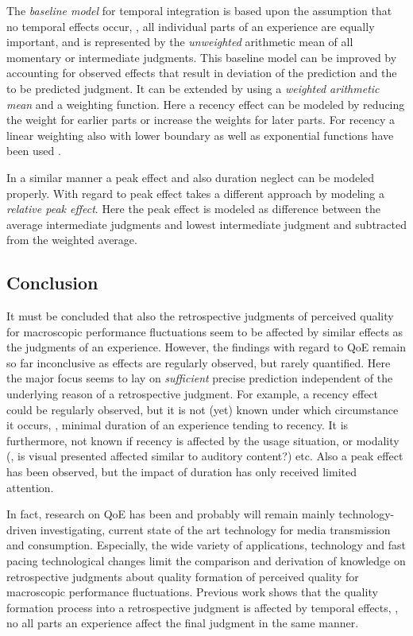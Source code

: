 The \emph{baseline model} for temporal integration is based upon the assumption that no temporal effects occur, \ie, all individual parts of an experience are equally important, and is represented by the \emph{unweighted} arithmetic mean of all momentary or intermediate judgments.
This baseline model can be improved by accounting for observed effects that result in deviation of the prediction and the to be predicted judgment.
It can be extended by using a \emph{weighted arithmetic mean} and a weighting function.
Here a recency effect can be modeled by reducing the weight for earlier parts \citep[\cf,][]{rosenbluth_testing_1998, weiss_modeling_2009, hamberg_time-varying_1999} or increase the weights for later parts.
For recency a linear weighting also with lower boundary \citep[\eg,][]{weiss_modeling_2009} as well as exponential functions have been used \cite[\eg,][]{hamberg_time-varying_1999}.

In a similar manner a peak effect and also duration neglect can be modeled properly.
With regard to 	peak effect \citet{weiss_modeling_2009} takes a different approach by modeling a \emph{relative peak effect}.
Here the peak effect is modeled as difference between the average intermediate judgments and lowest intermediate judgment and subtracted from the weighted average.


\subsection{Conclusion}
It must be concluded that also the retrospective judgments of perceived quality for macroscopic performance fluctuations seem to be affected by similar effects as the judgments of an experience.
However, the findings with regard to \ac{QoE} remain so far inconclusive as effects are regularly observed, but rarely quantified.
Here the major focus seems to lay on \emph{sufficient} precise prediction independent of the underlying reason of a retrospective judgment.
For example, a recency effect could be regularly observed, but it is not (yet) known under which circumstance it occurs, \eg, minimal duration of an experience tending to recency.
It is furthermore, not known if recency is affected by the usage situation, or modality (\eg, is visual presented affected similar to auditory content?) etc.
Also a peak effect has been observed, but the impact of duration has only received limited attention.

In fact, research on \ac{QoE} has been and probably will remain mainly technology-driven investigating, current state of the art technology for media transmission and consumption.
Especially, the wide variety of applications, technology and fast pacing technological changes limit the  comparison and derivation of knowledge on retrospective judgments about quality formation of perceived quality for macroscopic performance fluctuations.
Previous work shows that the quality formation process into a retrospective judgment is affected by temporal effects, \ie, no all parts an experience affect the final judgment in the same manner.
